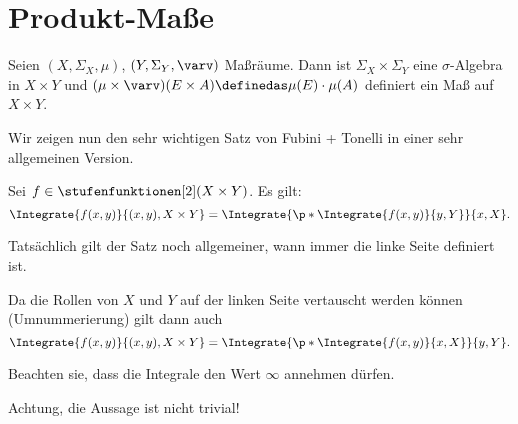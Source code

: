 \section{Produkt-Maße}
Seien \( (X,\Sigma_X,\mu) \), \( (Y,\Sigma_Y,\varv) \) Maßräume. Dann ist \( \Sigma_X \times \Sigma_Y \) eine \( \sigma \)-Algebra in \( X\times Y \) und \( (\mu\times \varv)(E\times A)\definedas \mu(E)\cdot \mu(A) \) definiert ein Maß auf \( X\times Y \).

Wir zeigen nun den sehr wichtigen Satz von Fubini + Tonelli in einer sehr allgemeinen Version.
\begin{satz}[Fubini]\label{fubini}
  Sei \( f\in \stufenfunktionen[2](X\times Y) \). Es gilt:
  \begin{equation*}
    \Integrate{f(x,y)}{{(x,y)},{X\times Y}}=\Integrate{\p*{\Integrate{f(x,y)}{y,Y}}}{x,X}.
  \end{equation*}
\end{satz}
\begin{bemerkung*}
  Tatsächlich gilt der Satz noch allgemeiner, wann immer die linke Seite definiert ist.
\end{bemerkung*}
\begin{bemerkung*}
  Da die Rollen von \( X \) und \( Y \) auf der linken Seite vertauscht werden können (Umnummerierung) gilt dann auch
  \begin{equation*}
    \Integrate{f(x,y)}{{(x,y)},{X\times Y}}=\Integrate{\p*{\Integrate{f(x,y)}{x,X}}}{y,Y}.
  \end{equation*}
\end{bemerkung*}
\begin{bemerkung*}
  Beachten sie, dass die Integrale den Wert \( \infty \) annehmen dürfen.
\end{bemerkung*}
Achtung, die Aussage ist nicht trivial!
